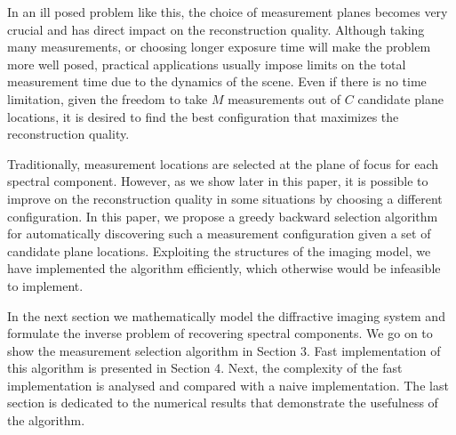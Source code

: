\documentclass{article}
\begin{document}
In an ill posed problem like this, the choice of measurement planes becomes very
crucial and has direct impact on the reconstruction quality. Although taking
many measurements, or choosing longer exposure time will make the problem more
well posed, practical applications usually impose limits on the total
measurement time due to the dynamics of the scene. Even if there is no time
limitation, given the freedom to take $M$ measurements out of $C$ candidate
plane locations, it is desired to find the best configuration that maximizes the
reconstruction quality.

Traditionally, measurement locations are selected at the plane of focus for each
spectral component. However, as we show later in this paper, it is possible to
improve on the reconstruction quality in some situations by choosing a different
configuration. In this paper, we propose a greedy backward selection algorithm
for automatically discovering such a measurement configuration given a set of
candidate plane locations. Exploiting the structures of the imaging model, we
have implemented the algorithm efficiently, which otherwise would be infeasible
to implement.

In the next section we mathematically model the diffractive imaging system and
formulate the inverse problem of recovering spectral components. We go on to
show the measurement selection algorithm in Section 3. Fast implementation of
this algorithm is presented in Section 4. Next, the complexity of the fast
implementation is analysed and compared with a naive implementation. The last
section is dedicated to the numerical results that demonstrate the usefulness of
the algorithm.



\end{document}
